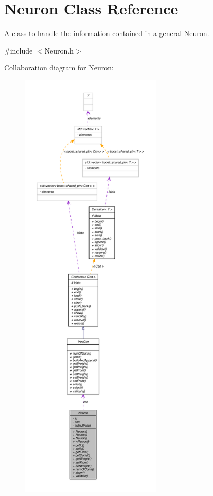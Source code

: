 \hypertarget{class_neuron}{
\section{Neuron Class Reference}
\label{class_neuron}
}


A class to handle the information contained in a general \hyperlink{class_neuron}{Neuron}.  




{\ttfamily \#include $<$Neuron.h$>$}



Collaboration diagram for Neuron:
\nopagebreak
\begin{figure}[H]
\begin{center}
\leavevmode
\includegraphics[height=600pt]{class_neuron__coll__graph}
\end{center}
\end{figure}
